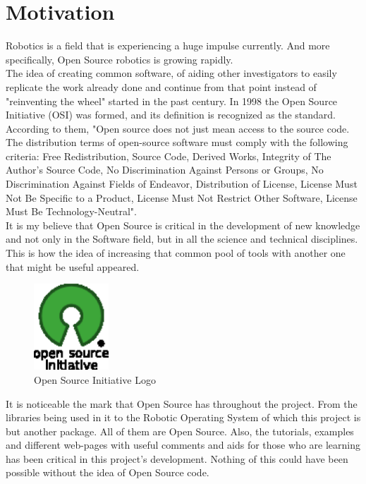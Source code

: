\chapter*{Motivation}

Robotics is a field that is experiencing a huge impulse currently. And more specifically, Open Source robotics is growing rapidly. 
\\

The idea of creating common software, of aiding other investigators to easily replicate the work already done and continue from that point instead of "reinventing the wheel" started in the past century. In 1998 the Open Source Initiative (OSI)\cite{osi} was formed, and its definition is recognized as the standard. According to them, "Open source does not just mean access to the source code. The distribution terms of open-source software must comply with the following criteria: Free Redistribution, Source Code, Derived Works, Integrity of The Author's Source Code, No Discrimination Against Persons or Groups, No Discrimination Against Fields of Endeavor, Distribution of License, License Must Not Be Specific to a Product, License Must Not Restrict Other Software,  License Must Be Technology-Neutral"\cite{osi_def}. 
\\

It is my believe that Open Source is critical in the development of new knowledge and not only in the Software field, but in all the science and technical disciplines. This is how the idea of increasing that common pool of tools with another one that might be useful appeared. 
\\
\begin{figure}
	\centering
    \includegraphics[width=0.25\textwidth]{img/intro/open_source.eps}
	\caption[Open Source Initiative Logo]{Open Source Initiative Logo}
\end{figure}

It is noticeable the mark that Open Source has throughout the project. From the libraries being used in it to the Robotic Operating System of which this project is but another package. All of them are Open Source. Also, the tutorials, examples and different web-pages with useful comments and aids for those who are learning has been critical in this project's development. Nothing of this could have been possible without the idea of Open Source code. 
\\

